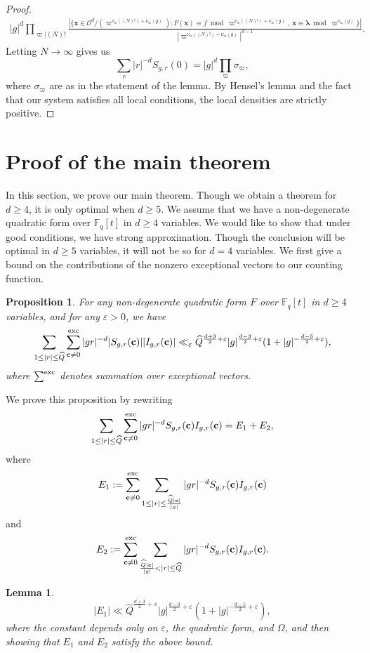 \documentclass[11pt]{amsart}
\theoremstyle{plain}
\theoremstyle{plain}
\newtheorem{proposition}[theorem]{Proposition}
\newtheorem{lemma}[theorem]{Lemma}
\renewcommand{\vec}[1]{\mathbf{#1}}
\theoremstyle{remark}
\theoremstyle{definition}
\newcommand{\hQ}{\widehat{Q}}
\newcommand{\exc}{\textup{exc}}
\begin{document}
\begin{proof}
\begin{eqnarray*}
|g|^d\prod_{\varpi|(N)!}\frac{\left|\{\vec{x}\in\mathcal{O}^d/(\varpi^{\nu_{\varpi}((N)!)+\nu_{\varpi}(g)}):F(\vec{x})\equiv f\bmod \varpi^{\nu_{\varpi}((N)!)+\nu_{\varpi}(g)},\ \vec{x}\equiv \boldsymbol{\lambda}\bmod \varpi^{\nu_{\varpi}(g)}\}\right|}{|\varpi^{\nu_{\varpi}((N)!)+\nu_{\varpi}(g)}|^{d-1}}.
\end{eqnarray*}
Letting $N\rightarrow\infty$ gives us
\[\sum_{r}|r|^{-d}S_{g,r}(0)=|g|^d\prod_{\varpi}\sigma_{\varpi},\]
where $\sigma_{\varpi}$ are as in the statement of the lemma. By Hensel's lemma and the fact that our system satisfies all local conditions, the local densities are strictly positive.

\end{proof}
\section{Proof of the main theorem}
In this section, we prove our main theorem. Though we obtain a theorem for $d\geq 4$, it is only optimal when $d\geq 5$. We assume that we have a non-degenerate quadratic form over $\mathbb{F}_q[t]$ in $d\geq 4$ variables. We would like to show that under good conditions, we have strong approximation. Though the conclusion will be optimal in $d\geq 5$ variables, it will not be so for $d=4$ variables. We first give a bound on the contributions of the nonzero exceptional vectors to our counting function.
\begin{proposition}\label{prop:small}For any non-degenerate quadratic form $F$ over $\mathbb{F}_q[t]$ in $d\geq 4$ variables, and for any $\varepsilon>0$, we have
\[\sum_{1\leq |r|\leq\hQ}\sum_{\vec{c}\neq 0}^{\exc}|gr|^{-d}|S_{g,r}(\vec{c})||I_{g,r}(\vec{c})|\ll_{\varepsilon} \hQ^{\frac{d+3}{2}+\varepsilon}|g|^{\frac{d-3}{2}+\varepsilon}(1+|g|^{-\frac{d-5}{2}+\varepsilon}),\]
where $\sum^{\exc}$ denotes summation over exceptional vectors.
\end{proposition}
We prove this proposition by rewriting
\[\sum_{1\leq |r|\leq\hQ}\sum_{\vec{c}\neq 0}^{\exc}|gr|^{-d}S_{g,r}(\vec{c})I_{g,r}(\vec{c})=E_1+E_2,\]
where
\[E_1:=\sum_{\vec{c}\neq 0}^{\exc}\sum_{1\leq |r|\leq\frac{\hQ |\vec{c}|}{|g|}}|gr|^{-d}S_{g,r}(\vec{c})I_{g,r}(\vec{c})\]
and
\[E_2:=\sum_{\vec{c}\neq 0}^{\exc}\sum_{\frac{\hQ |\vec{c}|}{|g|}< |r|\leq\hQ}|gr|^{-d}S_{g,r}(\vec{c})I_{g,r}(\vec{c}).\]
\begin{lemma}\label{lem:e1}
\[|E_1|\ll \hQ^{\frac{d+3}{2}+\varepsilon}|g|^{\frac{d-3}{2}+\varepsilon}(1+|g|^{-\frac{d-5}{2}+\varepsilon}),\]
where the constant depends only on $\varepsilon$, the quadratic form, and $\Omega$, and then showing that $E_1$ and $E_2$ satisfy the above bound.
\end{lemma}
\end{document}
